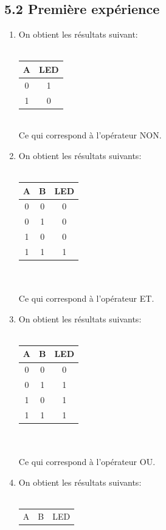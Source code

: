 \documentclass{report}
\begin{document}
\subsection*{5.2 Premi\`ere exp\'erience}
\begin{enumerate}
\item On obtient les r\'esultats suivant:\\
\\
\begin{tabular}{|c|c|}
\hline
A & LED \\
\hline
0&1\\
1&0\\
\hline
\end{tabular}\\
\hspace*{1,2cm} Ce qui correspond \`a l'opérateur NON.
\item On obtient les résultats suivants:\\
\\
\begin{tabular}{|c|c|c|}
\hline
A & B & LED \\
\hline
0&0&0\\
0&1&0\\
1&0&0\\
1&1&1\\
\hline
\end{tabular}\\
\\
\hspace*{1,2cm} Ce qui correspond \`a l'opérateur ET.
\item On obtient les résultats suivants:\\
\\
\begin{tabular}{|c|c|c|}
\hline
A & B & LED \\
\hline
0&0&0\\
0&1&1\\
1&0&1\\
1&1&1\\
\hline
\end{tabular}\\
\\
\hspace*{1,2cm} Ce qui correspond \`a l'opérateur OU.
\item On obtient les résultats suivants:\\
\\
\begin{tabular}{|c|c|c|}
\hline
A & B & LED \\

\end{tabular}
\end{enumerate}
\end{document}
